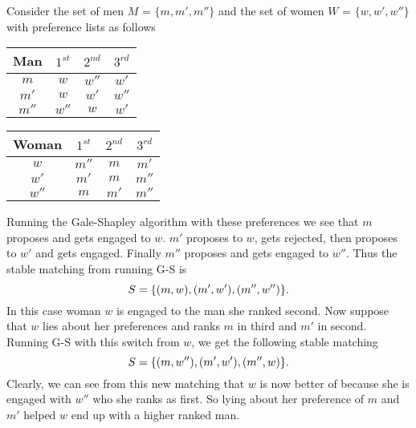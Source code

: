 \documentclass[12pt, oneside]{article}
\begin{document}
Consider the set of men $M$ = $\{m, m', m''\}$ and the set of women $W$ = $\{w, w', w''\}$ with preference lists as follows

\begin{center}
  \begin{tabular}{ c | c | c | c}
    Man & $1^{st}$ & $2^{nd}$ & $3^{rd}$ \\ \hline
    $m$ & $w$ & $w''$ & $w'$ \\ \hline
    $m'$ & $w$ & $w'$ & $w''$ \\ \hline
    $m''$ & $w''$ & $w$ & $w'$ \\
  \end{tabular}
\end{center}

\begin{center}
  \begin{tabular}{ c | c | c | c}
    Woman & $1^{st}$ & $2^{nd}$ & $3^{rd}$ \\ \hline
    $w$ & $m''$ & $m$ & $m'$ \\ \hline
    $w'$ & $m'$ & $m$ & $m''$ \\ \hline
    $w''$ & $m$ & $m'$ & $m''$ \\
  \end{tabular}
\end{center}

Running the Gale-Shapley algorithm with these preferences we see that $m$ proposes and gets engaged to $w$. $m'$ proposes to $w$, gets rejected, then proposes to $w'$ and gets engaged. Finally $m''$ proposes and gets engaged to $w''$. Thus the stable matching from running G-S is 
\[S = \{(m,w), (m',w'), (m'',w'')\} \ldotp \]
In this case woman $w$ is engaged to the man she ranked second. Now suppose that $w$ lies about her preferences and ranks $m$ in third and $m'$ in second. Running G-S with this switch from $w$, we get the following stable matching
\[S = \{(m,w''), (m',w'), (m'',w)\} \ldotp \]
Clearly, we can see from this new matching that $w$ is now better of because she is engaged with $w''$ who she ranks as first. So lying about her preference of $m$ and $m'$ helped $w$ end up with a higher ranked man.\\
\end{document}
